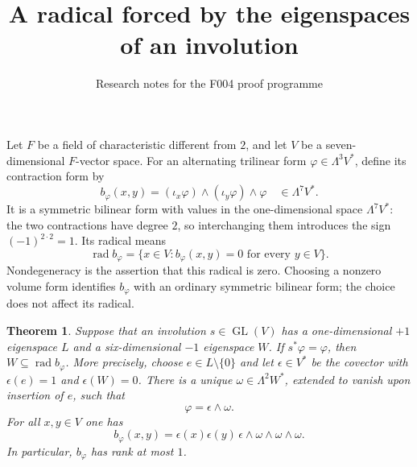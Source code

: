 \documentclass[11pt]{article}
\title{A radical forced by the eigenspaces of an involution}
\author{Research notes for the F004 proof programme}
\date{}
\newtheorem{theorem}{Theorem}
\newcommand{\rad}{\operatorname{rad}}
\begin{document}
\maketitle

Let $F$ be a field of characteristic different from $2$, and let $V$ be a
seven-dimensional $F$-vector space. For an alternating trilinear form
$\varphi\in\Lambda^3V^*$, define its contraction form by
\[
 b_\varphi(x,y)=(\iota_x\varphi)\wedge(\iota_y\varphi)\wedge\varphi
 \quad\in\Lambda^7V^*.
\]
It is a symmetric bilinear form with values in the one-dimensional space
$\Lambda^7V^*$: the two contractions have degree $2$, so interchanging them
introduces the sign $(-1)^{2\cdot2}=1$. Its radical means
\[
 \rad b_\varphi=\{x\in V:b_\varphi(x,y)=0\text{ for every }y\in V\}.
\]
Nondegeneracy is the assertion that this radical is zero. Choosing a nonzero
volume form identifies $b_\varphi$ with an ordinary symmetric bilinear form;
the choice does not affect its radical.

\begin{theorem}\label{thm:radical}
Suppose that an involution $s\in\operatorname{GL}(V)$ has a one-dimensional
$+1$ eigenspace $L$ and a six-dimensional $-1$ eigenspace $W$. If
$s^*\varphi=\varphi$, then $W\subseteq\rad b_\varphi$. More precisely, choose
$e\in L\setminus\{0\}$ and let $\epsilon\in V^*$ be the covector with
$\epsilon(e)=1$ and $\epsilon(W)=0$. There is a unique
$\omega\in\Lambda^2W^*$, extended to vanish upon insertion of $e$, such that
\[
 \varphi=\epsilon\wedge\omega.
\]
For all $x,y\in V$ one has
\begin{equation}\label{eq:rankone}
 b_\varphi(x,y)=\epsilon(x)\epsilon(y)\,
                  \epsilon\wedge\omega\wedge\omega\wedge\omega.
\end{equation}
In particular, $b_\varphi$ has rank at most $1$.
\end{theorem}
\end{document}
